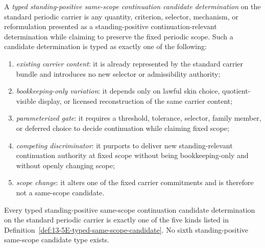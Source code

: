 \begin{manualdefinition}
\label{def:13-5E-typed-same-scope-candidate}
A \emph{typed standing-positive same-scope continuation candidate determination} on the standard periodic carrier is any quantity,
criterion, selector, mechanism, or reformulation presented as a standing-positive continuation-relevant determination while claiming to
preserve the fixed periodic scope. Such a candidate determination is typed as exactly one of the following:
\begin{enumerate}[label=(\roman*), leftmargin=2.2em]
\item \emph{existing carrier content}: it is already represented by the standard carrier bundle and introduces no new selector or admissibility authority;
\item \emph{bookkeeping-only variation}: it depends only on lawful skin choice, quotient-visible display, or licensed reconstruction of the same carrier content;
\item \emph{parameterized gate}: it requires a threshold, tolerance, selector, family member, or deferred choice to decide continuation while claiming fixed scope;
\item \emph{competing discriminator}: it purports to deliver new standing-relevant continuation authority at fixed scope without being bookkeeping-only and without openly changing scope;
\item \emph{scope change}: it alters one of the fixed carrier commitments and is therefore not a same-scope candidate.
\end{enumerate}
\end{manualdefinition}

\begin{manualtheorem}
\label{thm:13-5F-finite-same-scope-classification}
Every typed standing-positive same-scope continuation candidate determination on the standard periodic carrier is exactly one of the
five kinds listed in Definition~\ref{def:13-5E-typed-same-scope-candidate}. No sixth standing-positive same-scope
candidate type exists.
\end{manualtheorem}

